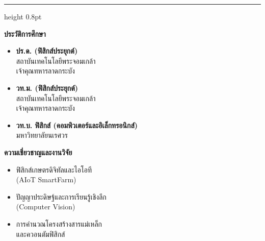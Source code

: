 \documentclass[12pt,twoside,openright]{book}
\begin{document}
\vspace{8pt}
{\color{rbruBorder}\hrule height 0.8pt}
\vspace{8pt}

\noindent
\begin{minipage}[t]{0.48\textwidth}
    {\fontsize{11}{14}\selectfont\bfseries\color{deepIndigo} ประวัติการศึกษา}\\[4pt]
    {\fontsize{9}{12}\selectfont
    \begin{itemize}[leftmargin=1.2em, itemsep=2pt]
        \item \textbf{ปร.ด. (ฟิสิกส์ประยุกต์)}\\สถาบันเทคโนโลยีพระจอมเกล้า\\เจ้าคุณทหารลาดกระบัง
        \item \textbf{วท.ม. (ฟิสิกส์ประยุกต์)}\\สถาบันเทคโนโลยีพระจอมเกล้า\\เจ้าคุณทหารลาดกระบัง
        \item \textbf{วท.บ. ฟิสิกส์ (คอมพิวเตอร์และอิเล็กทรอนิกส์)}\\มหาวิทยาลัยนเรศวร
    \end{itemize}}
\end{minipage}
\hfill
\begin{minipage}[t]{0.48\textwidth}
    {\fontsize{11}{14}\selectfont\bfseries\color{deepIndigo} ความเชี่ยวชาญและงานวิจัย}\\[4pt]
    {\fontsize{9}{12}\selectfont
    \begin{itemize}[leftmargin=1.2em, itemsep=2pt]
        \item ฟิสิกส์เกษตรดิจิทัลและไอโอที\\(AIoT SmartFarm)
        \item ปัญญาประดิษฐ์และการเรียนรู้เชิงลึก\\(Computer Vision)
        \item การคำนวณโครงสร้างสารแม่เหล็ก\\และควอนตัมฟิสิกส์
    \end{itemize}}
\end{minipage}
\end{document}
